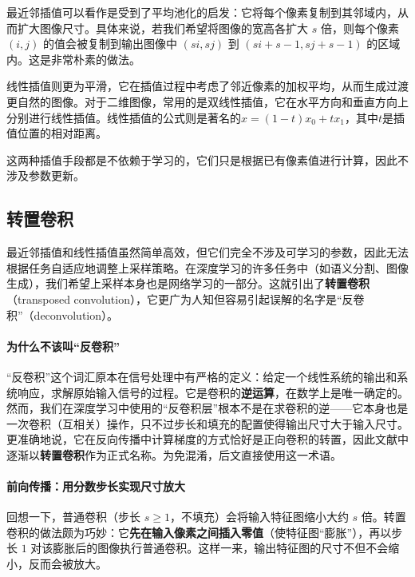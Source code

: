 最近邻插值可以看作是受到了平均池化的启发：它将每个像素复制到其邻域内，从而扩大图像尺寸。具体来说，若我们希望将图像的宽高各扩大 $s$ 倍，则每个像素 $(i,j)$ 的值会被复制到输出图像中 $(si, sj)$ 到 $(si+s-1, sj+s-1)$ 的区域内。这是非常朴素的做法。

线性插值则更为平滑，它在插值过程中考虑了邻近像素的加权平均，从而生成过渡更自然的图像。对于二维图像，常用的是双线性插值，它在水平方向和垂直方向上分别进行线性插值。线性插值的公式则是著名的$x = (1-t)x_0 + t x_1$，其中$t$是插值位置的相对距离。

这两种插值手段都是不依赖于学习的，它们只是根据已有像素值进行计算，因此不涉及参数更新。

\subsection{转置卷积}

最近邻插值和线性插值虽然简单高效，但它们完全不涉及可学习的参数，因此无法根据任务自适应地调整上采样策略。在深度学习的许多任务中（如语义分割、图像生成），我们希望上采样本身也是网络学习的一部分。这就引出了\textbf{转置卷积}（transposed convolution），它更广为人知但容易引起误解的名字是“反卷积”（deconvolution）。

\paragraph{为什么不该叫“反卷积”}

“反卷积”这个词汇原本在信号处理中有严格的定义：给定一个线性系统的输出和系统响应，求解原始输入信号的过程。它是卷积的\textbf{逆运算}，在数学上是唯一确定的。然而，我们在深度学习中使用的“反卷积层”根本不是在求卷积的逆——它本身也是一次卷积（互相关）操作，只不过步长和填充的配置使得输出尺寸大于输入尺寸。更准确地说，它在反向传播中计算梯度的方式恰好是正向卷积的转置，因此文献中逐渐以\textbf{转置卷积}作为正式名称\cite{dumoulin2018guideconvolutionarithmeticdeep}。为免混淆，后文直接使用这一术语。

\paragraph{前向传播：用分数步长实现尺寸放大}

回想一下，普通卷积（步长 $s\ge 1$，不填充）会将输入特征图缩小大约 $s$ 倍。转置卷积的做法颇为巧妙：它\textbf{先在输入像素之间插入零值}（使特征图“膨胀”），再以步长 $1$ 对该膨胀后的图像执行普通卷积。这样一来，输出特征图的尺寸不但不会缩小，反而会被放大。

